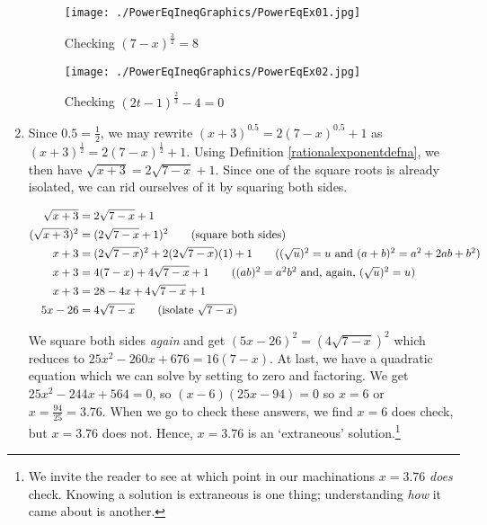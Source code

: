 \begin{ex}
\begin{enumerate}
\begin{figure}
\begin{center}

\texttt{[image: ./PowerEqIneqGraphics/PowerEqEx01.jpg]} 

\caption{Checking $(7-x)^{\frac{3}{2}} = 8$}
\label{fig:powereqex01}
\end{center}
\end{figure}

\begin{figure}
\begin{center}
      
\texttt{[image: ./PowerEqIneqGraphics/PowerEqEx02.jpg]}

\caption{Checking  $(2t-1)^{\frac{2}{3}} -4 = 0$}
\label{fig:powereqex02}
\end{center}
\end{figure}

\item Since $0.5 = \frac{1}{2}$, we may rewrite $(x+3)^{0.5} = 2(7-x)^{0.5}+1$ as  $(x+3)^{\frac{1}{2}} = 2(7-x)^{\frac{1}{2}}+1$.  Using Definition \ref{rationalexponentdefna}, we then have $\sqrt{x+3} = 2\sqrt{7-x} + 1$.  Since one of the square roots is already isolated, we can rid ourselves of it by squaring both sides.

\begin{align*}
\sqrt{x+3} & = 2\sqrt{7-x} + 1 \\
 (\sqrt{x+3})^2 & = (2\sqrt{7-x} + 1)^2 \tag{square both sides} \\
 x+3 & = (2 \sqrt{7-x})^2 + 2 (2 \sqrt{7-x})(1) + 1 \tag{$(\sqrt{u})^2 = u$ and $(a+b)^2 = a^2 + 2ab +b^2$} \\
 x+3 & = 4(7-x) + 4\sqrt{7-x} + 1 \tag{$(ab)^2 = a^2b^2$ and, again, $(\sqrt{u})^2 = u$} \\
 x+3 & = 28-4x+4\sqrt{7-x} + 1 \\
 5x-26 & = 4\sqrt{7-x} \tag{isolate $\sqrt{7-x}$}
\end{align*}
 
We square both sides \textit{again} and get $(5x-26)^2 = (4\sqrt{7-x})^2$ which reduces to $25x^2-260x+676 = 16(7-x)$. At last, we have a quadratic equation which we can solve by setting to zero and factoring.  We get  $25x^2-244x+564 = 0$, so $(x-6)(25x-94) = 0$ so $x = 6$ or $x = \frac{94}{25} = 3.76$.  When we go to check these answers, we find $x=6$ does check, but $x = 3.76$ does not. Hence, $x=3.76$ is an `extraneous' solution.\footnote{We invite the reader to see at which point in our machinations $x=3.76$ \textit{does} check.  Knowing a solution is extraneous is one thing;  understanding \textit{how} it came about is another.}


\end{enumerate}
\end{ex}
